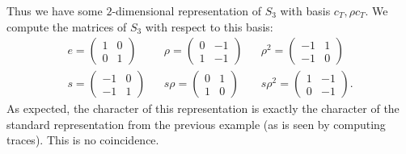 \documentclass[11pt, english]{article}
\begin{document}
Thus we have some $2$-dimensional representation of $S_3$ with basis $c_T, \rho c_T$. We compute the matrices of $S_3$ with respect to this basis:
\begin{align*}
e =
\begin{pmatrix}
1 & 0 \\ 0 & 1
\end{pmatrix}
&&
\rho = 
\begin{pmatrix}
0 & -1 \\ 1 & -1
\end{pmatrix}
&&
\rho^2 =
\begin{pmatrix}
-1 & 1 \\ -1 & 0
\end{pmatrix} \\
s =
\begin{pmatrix}
-1 & 0 \\ -1 & 1
\end{pmatrix}
&&
s\rho  =
\begin{pmatrix}
0 & 1 \\ 1 & 0
\end{pmatrix}
&&
s\rho^2  =
\begin{pmatrix}
1 & -1 \\ 0 & -1
\end{pmatrix}.
\end{align*}
As expected, the character of this representation is exactly the character of the standard representation from the previous example (as is seen by computing traces). This is no coincidence.



 
\end{document}
